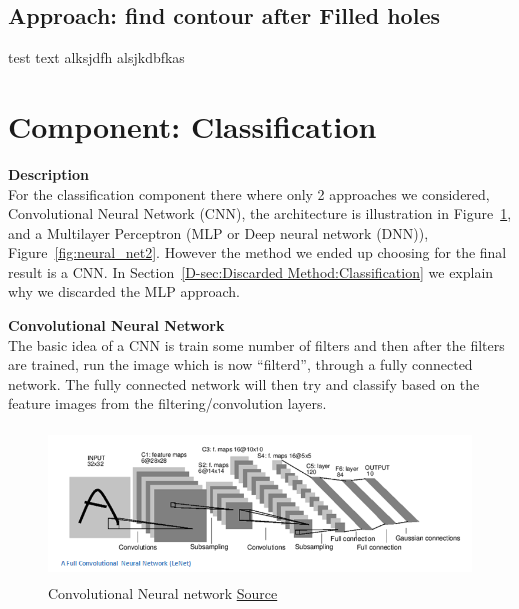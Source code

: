 \documentclass[Report.tex]{subfiles}
\begin{document}
\subsection{Approach: find contour after Filled holes}
test text alksjdfh alsjkdbfkas


\section{Component: Classification}
\label{Method:Classification}
\begin{flushleft}
  \textbf{Description} \\
  For the classification component there where only 2 approaches we considered,
  Convolutional Neural Network (CNN), the architecture is illustration in
  Figure~\ref{fig:CNN_architecture}, and a Multilayer Perceptron (MLP or Deep
  neural network (DNN)), Figure~\ref{fig:neural_net2}. However the method we
  ended up choosing for the final result is a CNN. In
  Section~\ref{D-sec:Discarded Method:Classification} we explain why we discarded
  the MLP approach.
\end{flushleft}

\begin{flushleft}
  \textbf{Convolutional Neural Network} \\
  The basic idea of a CNN is train some number of filters and then
  after the filters are trained, run the image which is now ``filterd'', through
  a fully connected network. The fully connected network will then try and
  classify based on the feature images from the filtering/convolution layers. \par



\end{flushleft}

\begin{figure}[H]
  \centering
  \includegraphics[height=4cm]{res/LeNet.png}
  \caption{Convolutional Neural network \href{https://adeshpande3.github.io/A-Beginner\%27s-Guide-To-Understanding-Convolutional-Neural-Networks/}{Source}}
  \label{fig:CNN_architecture}
\end{figure}
\end{document}
